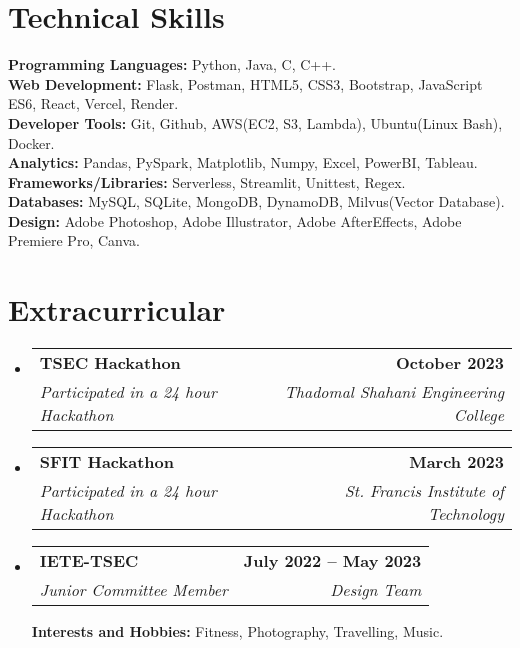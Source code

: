 \documentclass[letterpaper,11pt]{article}
\makeatletter
\newcommand{\resumeItem}[1]{
  \item\small{
    {#1 \vspace{-2pt}}
  }
}
\newcommand{\resumeSubheading}[4]{
  \vspace{-2pt}\item
    \begin{tabular*}{1.0\textwidth}[t]{l@{\extracolsep{\fill}}r}
      \textbf{#1} & \textbf{\small #2} \\
      \textit{\small#3} & \textit{\small #4} \\
    \end{tabular*}\vspace{-7pt}
}
\newcommand{\resumeSubHeadingListStart}{\begin{itemize}[leftmargin=0.0in, label={}]}
\newcommand{\resumeSubHeadingListEnd}{\end{itemize}}
\newcommand{\resumeItemListStart}{\begin{itemize}}
\newcommand{\resumeItemListEnd}{\end{itemize}\vspace{-5pt}}
\makeatother
\begin{document}
\section{Technical Skills}
\vspace{-5pt}
 \begin{itemize}[leftmargin=0.15in, label={}]
    \small{\item{
     \textbf{Programming Languages: }{Python, Java, C, C++.} \\
     \textbf{Web Development: }{Flask, Postman, HTML5, CSS3, Bootstrap, JavaScript ES6, React, Vercel, Render.} \\
     \textbf{Developer Tools: }{Git, Github, AWS(EC2, S3, Lambda), Ubuntu(Linux Bash), Docker.} \\
     \textbf{Analytics: }{Pandas, PySpark, Matplotlib, Numpy, Excel, PowerBI, Tableau.} \\
     \textbf{Frameworks/Libraries: }{Serverless, Streamlit, Unittest, Regex.} \\
     \textbf{Databases: }{MySQL, SQLite, MongoDB, DynamoDB, Milvus(Vector Database).} \\
     \textbf{Design: }{Adobe Photoshop, Adobe Illustrator, Adobe AfterEffects, Adobe Premiere Pro, Canva.} \\
    }}
 \end{itemize}
 \vspace{-20pt}


\section{Extracurricular}
\vspace{-5pt}
    \resumeSubHeadingListStart

        \resumeSubheading{TSEC Hackathon}{October 2023}{Participated in a 24 hour Hackathon}{Thadomal Shahani Engineering College}
        \vspace{3pt}
        \resumeSubheading{SFIT Hackathon}{March 2023}{Participated in a 24 hour Hackathon}{St. Francis Institute of Technology}
\vspace{3pt}
        \resumeSubheading{IETE-TSEC}{July 2022 -- May 2023}{Junior Committee Member}{Design Team}
            \resumeItemListStart
            \vspace{3pt}
            \resumeItemListEnd

        \vspace{8pt}
        \textbf{Interests and Hobbies: }{Fitness, Photography, Travelling, Music.} \\

    \resumeSubHeadingListEnd

    
\end{document}
